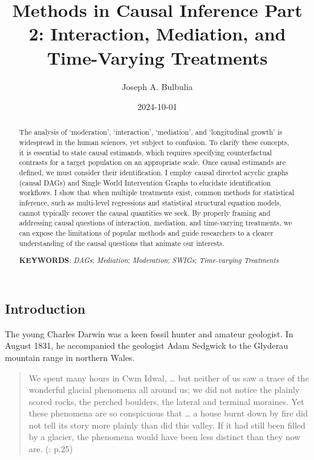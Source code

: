 \documentclass[
  single column]{article}
\title{Methods in Causal Inference Part 2: Interaction, Mediation, and
Time-Varying Treatments}
\author{Joseph A. Bulbulia}
\affil{%
             \small{     Victoria University of Wellington, NEW ZEALAND
          ORCID \textcolor[HTML]{A6CE39}{\aiOrcid} ~0000-0002-5861-2056 }
              }
\date{2024-10-01}
\begin{document}
\maketitle
\begin{abstract}
The analysis of `moderation', `interaction', `mediation', and
`longitudinal growth' is widespread in the human sciences, yet subject
to confusion. To clarify these concepts, it is essential to state causal
estimands, which requires specifying counterfactual contrasts for a
target population on an appropriate scale. Once causal estimands are
defined, we must consider their identification. I employ causal directed
acyclic graphs (causal DAGs) and Single World Intervention Graphs to
elucidate identification workflows. I show that when multiple treatments
exist, common methods for statistical inference, such as multi-level
regressions and statistical structural equation models, cannot typically
recover the causal quantities we seek. By properly framing and
addressing causal questions of interaction, mediation, and time-varying
treatments, we can expose the limitations of popular methods and guide
researchers to a clearer understanding of the causal questions that
animate our interests.

\textbf{KEYWORDS}: \emph{DAGs}; \emph{Mediation}; \emph{Moderation};
\emph{SWIGs}; \emph{Time-varying Treatments}
\end{abstract}


\subsection{Introduction}\label{id-introduction}

The young Charles Darwin was a keen fossil hunter and amateur geologist.
In August 1831, he accompanied the geologist Adam Sedgwick to the
Glyderau mountain range in northern Wales.

\begin{quote}
We spent many hours in Cwm Idwal, \ldots{} but neither of us saw a trace
of the wonderful glacial phenomena all around us; we did not notice the
plainly scored rocks, the perched boulders, the lateral and terminal
moraines. Yet these phenomena are so conspicuous that \ldots{} a house
burnt down by fire did not tell its story more plainly than did this
valley. If it had still been filled by a glacier, the phenomena would
have been less distinct than they now are.
(: p.25)
\end{quote}
\end{document}
